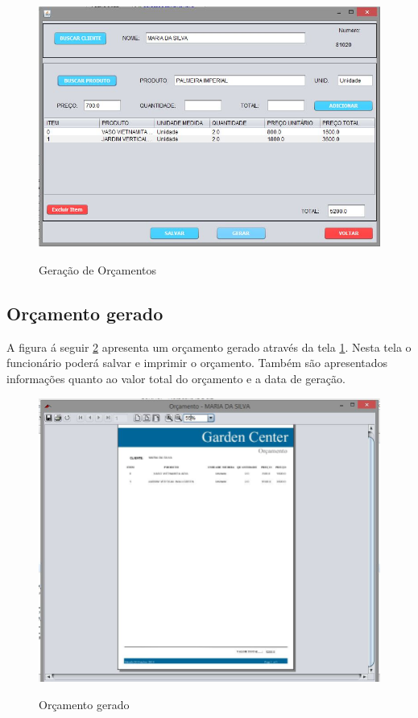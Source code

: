 \begin{figure}[H]
\centering
\caption{Geração de Orçamentos}
\includegraphics[width=14cm]{imagens/telas/GeraOrcamento}
\label{fig:Geração de orçamento}
\end{figure}      

\subsection{Orçamento gerado}
A figura á seguir \ref{fig:Orçamento Gerado} apresenta um orçamento gerado através da tela \ref{fig:Geração de orçamento}. Nesta tela o funcionário poderá salvar e imprimir o orçamento. Também são apresentados informações quanto ao valor total do orçamento e a data de geração.
\begin{figure}[H]
\centering
\caption{Orçamento gerado}
\includegraphics[width=15cm]{imagens/telas/OrcamentoGerado}
\label{fig:Orçamento Gerado}
  
\end{figure}  
      
